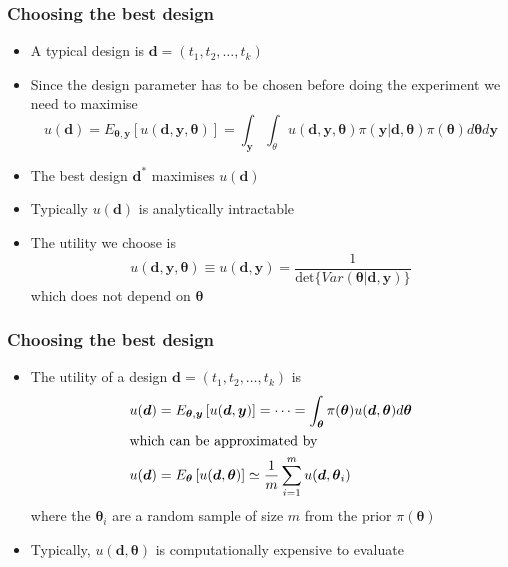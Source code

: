 \documentclass[t,compress]{beamer}
\newcommand{\by}{\boldsymbol{y}}
\newcommand{\btheta}{\boldsymbol{\theta}}
\newcommand{\bd}{\boldsymbol{d}}
\begin{document}
\begin{frame}
\frametitle{Choosing the best design}
\begin{itemize}
\item A typical design is $\bd = (t_1, t_2, \ldots, t_k)$
\item Since the design parameter has to be chosen before doing the experiment we need to maximise 
\[
u(\bd) = E_{\btheta,\by}[u(\bd,\by,\btheta)]=\int_{\by}\int_{\theta}u(\bd,\by,\btheta)\pi(\by|\bd,\btheta)\pi(\btheta)d\btheta d\by
\]
\item The best design $\bd^{\ast}$ maximises $u(\bd)$ 
\item Typically $u(\bd)$ is analytically intractable
\item The utility we choose is
\begin{equation*}
u(\bd,\by,\btheta)\equiv u(\bd,\by)
=\frac{1}{\text{det}\{Var(\btheta | \bd,\by)\}}
\end{equation*}
which does not depend on $\btheta$

\end{itemize} 
\end{frame}



\begin{frame}
\frametitle{Choosing the best design}
\begin{itemize}
\item The utility of a design $\bd = (t_1, t_2, \ldots, t_k)$ is
\begin{align*}
u(\bd)&=E_{\btheta,\by}\left[u(\bd,\by)\right] = \cdots 
=\int_{\btheta} \pi(\btheta) u(\bd,\btheta) d \btheta \\
\intertext{which can be approximated by}
u(\bd) &= E_{\btheta}\left[u(\bd,\btheta)\right] \simeq \frac{1}{m}\sum_{i=1}^{m} u(\bd,\btheta_i)
\end{align*} 
where the $\btheta_i$ are a random sample of size $m$ from the prior $\pi(\btheta)$
\item Typically, $u(\bd, \btheta)$ is computationally expensive to evaluate
\end{itemize}
\end{frame}
\end{document}
